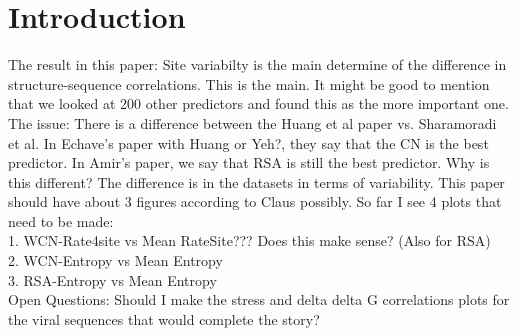\documentclass[12pt]{article}
\begin{document}
\section{Introduction}
\label{sec:intro}

{\color{blue}
The result in this paper: Site variabilty is the main determine of the difference in structure-sequence correlations. This is the main. It might be good to mention that we looked at 200 other predictors and found this as the more important one. The issue: There is a difference between the Huang et al paper vs. Sharamoradi et al. In Echave's paper with Huang or Yeh?, they say that the CN is the best predictor. In Amir's paper, we say that RSA is still the best predictor. Why is this different? The difference is in the datasets in terms of variability. This paper should have about 3 figures according to Claus possibly. So far I see 4 plots that need to be made: \\
1. WCN-Rate4site vs Mean RateSite??? Does this make sense? (Also for RSA) \\
2. WCN-Entropy vs Mean Entropy \\
3. RSA-Entropy vs Mean Entropy \\
Open Questions: Should I make the stress  and delta delta G correlations plots for the viral sequences that would complete the story?}
\end{document}
